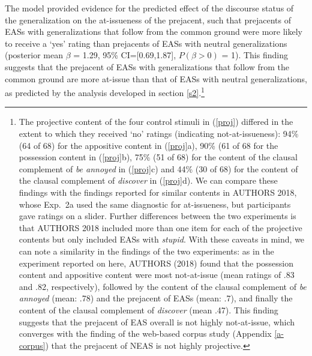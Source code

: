 \documentclass[11pt,fleqn]{article}
\newcommand{\6}{\mbox{$[\hspace*{-.6mm}[$}}
\newcommand{\9}{\mbox{$]\hspace*{-.6mm}]$}}
\begin{document}
The model provided evidence for the predicted effect of the discourse status of the generalization on the at-issueness of the prejacent, such that  prejacents of EASs with generalizations that follow from the common ground were more likely to receive a `yes' rating than prejacents of EASs with neutral generalizations  (posterior mean $\beta$ = 1.29, 95\% CI={[}0.69,1.87{]}, $P(\beta > 0)$ = 1). This finding suggests that the prejacent of EASs with generalizations that follow from the common ground are more at-issue than that of EASs with neutral generalizations, as predicted by the analysis developed in section \ref{s2}.\footnote{The projective content of the four control stimuli in (\ref{proj}) differed in the extent to which they received `no' ratings (indicating not-at-issueness): 94\% (64 of 68) for the appositive content in (\ref{proj}a), 90\% (61 of 68 for the possession content in (\ref{proj}b), 75\% (51 of 68) for the content of the clausal complement of {\em be annoyed} in (\ref{proj}c) and 44\% (30 of 68) for the content of the clausal complement of {\em discover} in (\ref{proj}d). We can compare these findings with the findings reported for similar contents in AUTHORS 2018, whose Exp.~2a used the same diagnostic for at-issueness, but participants gave ratings on a slider. Further differences between the two experiments is that AUTHORS 2018 included more than one item for each of the projective contents but only included EASs with {\em stupid}. With these caveats in mind, we can note a similarity in the findings of the two experiments: as in the experiment reported on here, AUTHORS (2018) found that the possession content and appositive content were most not-at-issue (mean ratings of .83 and .82, respectively), followed by the content of the clausal complement of {\em be annoyed} (mean: .78) and the prejacent of EASs (mean: .7), and finally the content of the clausal complement of {\em discover} (mean .47). This finding suggests that the prejacent of EAS overall is not highly not-at-issue, which converges with the finding of the web-based corpus study (Appendix \ref{a-corpus}) that the prejacent of NEAS is not highly projective.}



  
\end{document}
